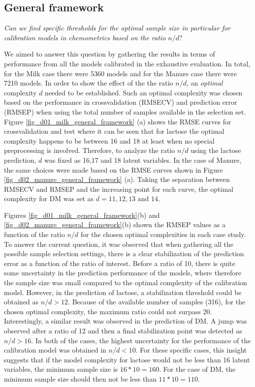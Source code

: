 \documentclass{article}
\begin{document}
\subsection*{General framework}\label{results:genframework}

\emph{Can  we  find  specific  thresholds  for  the  optimal  sample  size  in  particular  for  calibration  models  in chemometrics based on the ratio $n/d?$}

We aimed to answer this question by gathering the results in terms of performance from all the models calibrated in the exhaustive evaluation. In total, for the Milk case there were 5360 models and for the Manure case there were 7210 models. In order to show the effect of the the ratio $n/d$, an \emph{optimal} complexity $d$ needed to be established. Such an optimal complexity was chosen based on the performance in crossvalidation (RMSECV) and prediction error (RMSEP) when using the total number of samples available in the selection set. Figure \ref{fig_d01_milk_general_framework} (a) shows the RMSE curves for crossvalidation and test where it can be seen that for lactose the optimal complexity happens to be between 16 and 18 at least when no special preprocessing is involved. Therefore, to analyze the ratio $n/d$ using the lactose prediction, $d$ was fixed as 16,17 and 18 latent variables. In the case of Manure, the same choices were made based on the RMSE curves shown in Figure \ref{fig_d02_manure_general_framework} (a). Taking the separation between RMSECV and RMSEP and the increasing point for each curve, the optimal complexity for DM was set as $d = 11,12,13 \text{ and } 14$. 

Figures \ref{fig_d01_milk_general_framework}(b) and \ref{fig_d02_manure_general_framework}(b) shown the RMSEP values as a function of the ratio $n/d$ for the chosen optimal complexities in each case study. To answer the current question, it was observed that when gathering all the possible sample selection settings, there is a clear stabilization of the prediction error as a function of the ratio of interest. Before a ratio of 10, there is quite some uncertainty in the prediction performance of the models, where therefore the sample size was small compared to the optimal complexity of the calibration model. However, in the prediction of lactose, a stabilization threshold could be obtained as $n/d>12$. Because of the available number of samples (316), for the chosen optimal complexity, the maximum ratio could not surpass 20. Interestingly, a similar result was observed in the prediction of DM. A jump was observed after a ratio of 12 and then a final stabilization point was detected as $n/d>16$. In both of the cases, the highest uncertainty for the performance of the calibration model was obtained in $n/d<10$. For these specific cases, this insight suggests that if the model complexity for lactose would not be less than 16 latent variables, the minimum sample size is $16*10=160$. For the case of DM, the minimum sample size should then not be less than $11*10=110$. 
\end{document}
